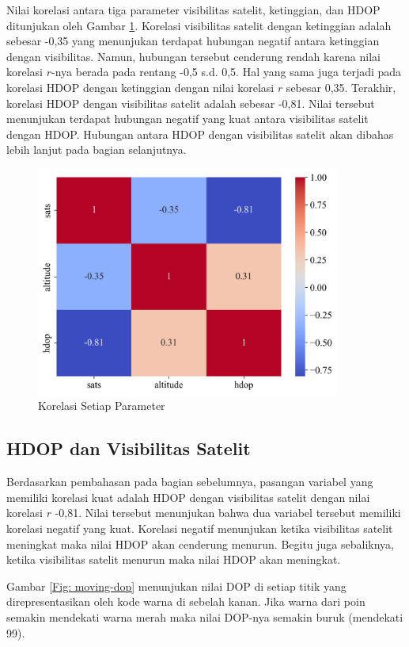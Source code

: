 Nilai korelasi antara tiga parameter visibilitas satelit, ketinggian, dan HDOP ditunjukan oleh Gambar \ref{Fig: moving-corr}. Korelasi visibilitas satelit dengan ketinggian adalah sebesar -0,35 yang menunjukan terdapat hubungan negatif antara ketinggian dengan visibilitas. Namun, hubungan tersebut cenderung rendah karena nilai korelasi $r$-nya berada pada rentang -0,5 s.d. 0,5. Hal yang sama juga terjadi pada korelasi HDOP dengan ketinggian dengan nilai korelasi $r$ sebesar 0,35. Terakhir, korelasi HDOP dengan visibilitas satelit adalah sebesar -0,81. Nilai tersebut menunjukan terdapat hubungan negatif yang kuat antara visibilitas satelit dengan HDOP. Hubungan antara HDOP dengan visibilitas satelit akan dibahas lebih lanjut pada bagian selanjutnya.

\begin{figure}[H]
	\centering
	\includegraphics[width=10cm]{contents/chapter-4/pengujian-bergerak/corr.png}
	\caption{Korelasi Setiap Parameter}
	\label{Fig: moving-corr}
\end{figure}

\subsection{HDOP dan Visibilitas Satelit}

Berdasarkan pembahasan pada bagian sebelumnya, pasangan variabel yang memiliki korelasi kuat adalah HDOP dengan visibilitas satelit dengan nilai korelasi $r$ -0,81. Nilai tersebut menunjukan bahwa dua variabel tersebut memiliki korelasi negatif yang kuat. Korelasi negatif menunjukan ketika visibilitas satelit meningkat maka nilai HDOP akan cenderung menurun. Begitu juga sebaliknya, ketika visibilitas satelit menurun maka nilai HDOP akan meningkat.

Gambar \ref{Fig: moving-dop} menunjukan nilai DOP di setiap titik yang direpresentasikan oleh kode warna di sebelah kanan. Jika warna dari poin semakin mendekati warna merah maka nilai DOP-nya semakin buruk (mendekati 99). 

